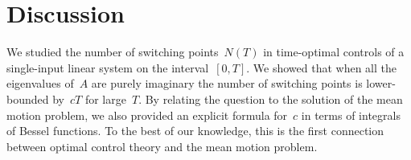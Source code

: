 \documentclass[final ]{IEEEtran}
\begin{document}

\section{Discussion}
We studied  the number of switching  points~$N(T)$ in time-optimal controls of a single-input linear system on the interval~$[0,T]$. We showed that when  all the eigenvalues
of~$A$ are purely imaginary 
the number of switching points
is lower-bounded by~$c T$ for large~$T$.
By relating the question to the
solution of
the mean motion problem, we also provided 
 an explicit formula for~$c$ in terms of integrals  of Bessel functions.
To the best of our knowledge, this is the first connection between optimal control theory and the mean motion problem. 
\end{document}
